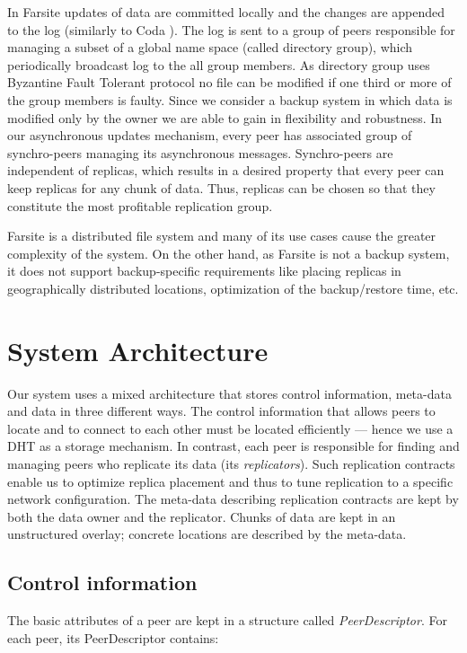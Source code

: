\documentclass[10pt, final, conference, letterpaper]{IEEEtran}
\begin{document}
In Farsite updates of data are committed locally and the changes are appended to the log (similarly to Coda \cite{codaDisconnectedOps}). The log is sent to a group of peers responsible for managing a subset of a global name space (called directory group), which periodically broadcast log to the all group members. As directory group uses Byzantine Fault Tolerant protocol \cite{farsiteByzantine}
no file can be modified if one third or more of the group members is faulty. Since we consider a backup system in which data is modified only by the owner
we are able to gain in flexibility and robustness. In our asynchronous updates mechanism, every peer has associated group of synchro-peers managing its asynchronous messages. Synchro-peers are independent of replicas, which results in a desired property that every peer can keep replicas for any chunk of data. Thus, replicas can be chosen so that they constitute the most profitable replication group.

Farsite is a distributed file system and many of its use cases cause the greater complexity of the system. On the other hand, as Farsite is not a backup system, it does not support backup-specific requirements like placing replicas in geographically distributed locations, optimization of the backup/restore time, etc. 






\section{System Architecture}\label{sec::architecture}
Our system uses a mixed architecture that stores control information, meta-data and data in three different ways.
The control information that allows peers to locate and to connect to each other 
must be located efficiently --- hence we use a DHT as a storage mechanism. 
In contrast, each peer is responsible for finding and managing peers who replicate its data (its \emph{replicators}).
Such replication contracts enable us to optimize replica placement and thus to tune replication to a specific network configuration.
The meta-data describing replication contracts are kept by both the data owner and the replicator.
Chunks of data are kept in an unstructured overlay; concrete locations are described by the meta-data.






\subsection{Control information}\label{sec::metadata}
The basic attributes of a peer are kept in a structure called \textit{PeerDescriptor}. 
For each peer, its PeerDescriptor contains:
\end{document}
